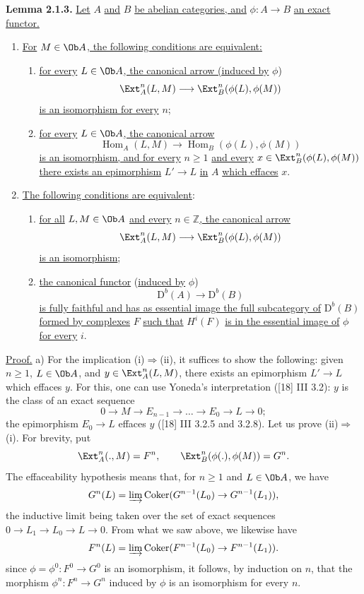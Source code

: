 \textbf{Lemma 2.1.3.} \uline{Let} $A$ \uline{and} $B$ \uline{be abelian categories, and} $\phi:A\to B$ \uline{an exact functor.}
\begin{enumerate}[label=\alph*)]
\item \uline{For} $M\in\Ob A$\uline{, the following conditions are equivalent:}
\begin{enumerate}[label=(\roman*)]
\item \uline{for every} $L\in\Ob A$\uline{, the canonical arrow (induced by} $\phi$)
\[
\Ext^n_{A}(L,M)\longrightarrow\Ext^n_{B}(\phi(L),\phi(M))
\]
\uline{is an isomorphism for every} $n$;
\item \uline{for every} $L\in\Ob A$\uline{, the canonical arrow}
%
\[
\operatorname{Hom}_{A}(L,M)\longrightarrow\operatorname{Hom}_{B}(\phi(L),\phi(M))
\]
\uline{is an
isomorphism, and for every} $n\ge1$ \uline{and every} $x\in\Ext^n_{B}(\phi(L),\phi(M))$ \uline{there exists an epimorphism} $L'\to L$ \uline{in} $A$ \uline{which effaces} $x$.
\end{enumerate}
\item \uline{The following conditions are equivalent}:
\begin{enumerate}[label=(\roman*)]
\item \uline{for all} $L,M\in\Ob A$ \uline{and every} $n\in\mathbb Z$\uline{, the canonical arrow}
\[
\Ext^n_{A}(L,M)\longrightarrow\Ext^n_{B}(\phi(L),\phi(M))
\]
\uline{is an isomorphism};
\item \uline{the canonical functor} (\uline{induced by} $\phi$)
\[
\mathrm D^b(A)\longrightarrow\mathrm D^b(B)
\]
\uline{is fully faithful and has as essential image the full subcategory of} $\mathrm D^b(B)$ \uline{formed by complexes} $F$ \uline{such that} $H^i(F)$ \uline{is in the essential image of} $\phi$ \uline{for every} $i$.
\end{enumerate}
\end{enumerate}

\uline{Proof.} a) For the implication (i)$\Rightarrow$(ii), it suffices to show the following: given $n\ge1$, $L\in\Ob A$, and $y\in\Ext^n_{A}(L,M)$, there exists an epimorphism $L'\to L$ which effaces $y$. For this, one can use Yoneda's interpretation ([18] III 3.2): $y$ is the class of an exact sequence
\[
0\longrightarrow M\longrightarrow E_{n-1}\longrightarrow\ldots\longrightarrow E_0\longrightarrow L\longrightarrow0;
\]
the epimorphism $E_0\to L$ effaces $y$ ([18] III 3.2.5 and 3.2.8). Let us prove (ii)$\Rightarrow$(i). For brevity, put
\[
\Ext^n_{A}(.,M)=F^n,\qquad
\Ext^n_{B}(\phi(.),\phi(M))=G^n.
\]
The effaceability hypothesis means that, for $n\ge1$ and $L\in\Ob A$, we have
\[
G^n(L)=\varinjlim\operatorname{Coker}(G^{n-1}(L_0)\to G^{n-1}(L_1)),
\]
the inductive limit being taken over the set of exact sequences
%
$0\to L_1\to L_0\to L\to0$. From
what we saw above, we likewise have
\[
F^n(L)=\varinjlim\operatorname{Coker}(F^{n-1}(L_0)\to F^{n-1}(L_1)).
\]
since $\phi=\phi^0:F^0\to G^0$ is an isomorphism, it follows, by induction on $n$, that the morphism $\phi^n:F^n\to G^n$ induced by $\phi$ is an isomorphism for every $n$.

